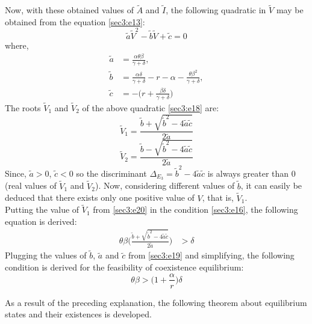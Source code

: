 \documentclass[12pt,a4wide]{report}
\numberwithin{equation}{chapter}
\numberwithin{theorem}{chapter}
\begin{document}
\begin{enumerate}[i)]
Now, with these obtained values of $\tilde A$ and $\tilde I$, the following quadratic in $\tilde V$ may be obtained from the equation \eqref{sec3:e13}:
\begin{equation}\label{sec3:e18}
\tilde a \tilde V^2 - \tilde b \tilde V + \tilde  c =0
\end{equation}
where,
\begin{align}\label{sec3:e19}
\tilde a &= \frac{\alpha \theta \beta}{\gamma +\delta},\\
\tilde b &= \frac{\alpha \delta}{\gamma + \delta} -r-\alpha -\frac{\theta \beta^2}{\gamma + \delta},\\
\tilde c &= -\bigg( r+\frac{\beta \delta}{\gamma + \delta}\bigg)
\end{align}
The roots $\tilde V_1$ and $\tilde V_2$ of the above quadratic \eqref{sec3:e18} are:
\begin{equation}\label{sec3:e20}
\tilde V_1 = \frac{\tilde b + \sqrt{\tilde b^2 - 4\tilde a \tilde c}}{2 \tilde a}
\end{equation}
\begin{equation}\label{sec3:e21}
\tilde V_2 = \frac{\tilde b - \sqrt{\tilde b^2 - 4\tilde a \tilde c}}{2 \tilde a}
\end{equation}
Since, $\tilde a>0$, $\tilde c<0$ so the discriminant $\Delta_{E_3}=\tilde b^{2}-4\tilde a \tilde c$ is always greater than $0$ (real values of $\tilde V_1$ and $\tilde V_2$). Now, considering different values of $\tilde b$, it can easily be deduced that there exists only one positive value of $V$, that is, $\tilde V_1$.\\

Putting the value of $\tilde V_1$ from \eqref{sec3:e20} in the condition \eqref{sec3:e16}, the following equation is derived:
\begin{align}\label{sec3:e23}
\theta \beta \bigg(  \frac{\tilde b + \sqrt{\tilde b^2 - 4\tilde a \tilde c}}{2 \tilde a} \bigg) &> \delta 
\end{align}
Plugging the values of $\tilde b$, $\tilde a$ and $\tilde c$ from \eqref{sec3:e19} and simplifying, the following condition is derived for the feasibility of coexistence equilibrium:
\begin{equation} \label{sec3:e24}
\theta \beta > \bigg(1+\frac{\alpha}{r}\bigg)\delta
\end{equation}

\end{enumerate}
As a result of the preceding explanation, the following theorem about equilibrium states and their existences is developed.
\end{document}
